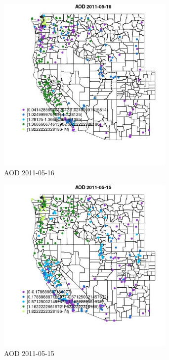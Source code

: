 \begin{figure} 
\centering  
\includegraphics[width=0.77\textwidth]{Code_Outputs/ML_input_report_ML_input_PM25_Step5_part_d_de_duplicated_aves_ML_input_MapObsAOD2011-05-16.jpg} 
\caption{\label{fig:ML_input_report_ML_input_PM25_Step5_part_d_de_duplicated_aves_ML_inputMapObsAOD2011-05-16}AOD 2011-05-16} 
\end{figure} 
 

\begin{figure} 
\centering  
\includegraphics[width=0.77\textwidth]{Code_Outputs/ML_input_report_ML_input_PM25_Step5_part_d_de_duplicated_aves_ML_input_MapObsAOD2011-05-15.jpg} 
\caption{\label{fig:ML_input_report_ML_input_PM25_Step5_part_d_de_duplicated_aves_ML_inputMapObsAOD2011-05-15}AOD 2011-05-15} 
\end{figure} 
 

